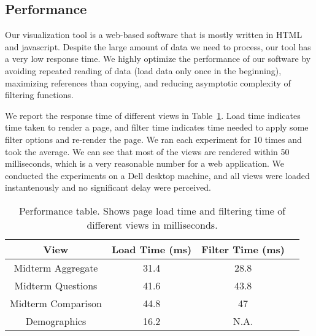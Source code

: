 \subsection{Performance}
Our visualization tool is a web-based software that is mostly written in HTML and javascript. Despite the large amount of data we need to process, our tool has a very low response time. We highly optimize the performance of our software by avoiding repeated reading of data (load data only once in the beginning), maximizing references than copying, and reducing asymptotic complexity of filtering functions.

We report the response time of different views in Table~\ref{tab:performance}. Load time indicates time taken to render a page, and filter time indicates time needed to apply some filter options and re-render the page. We ran each experiment for 10 times and took the average. We can see that most of the views are rendered within 50 milliseconds, which is a very reasonable number for a web application. We conducted the experiments on a Dell desktop machine, and all views were loaded instantenously and no significant delay were perceived.

\begin{table}
\begin{tabular}{ | c | c | c | c |}
  \hline
  View & Load Time (ms) & Filter Time (ms) \\ \hline
  Midterm Aggregate & 31.4 & 28.8 \\ \hline
  Midterm Questions & 41.6 & 43.8 \\ \hline
  Midterm Comparison & 44.8 & 47 \\ \hline
  Demographics & 16.2 & N.A. \\ \hline
\end{tabular}
\caption{Performance table. Shows page load time and filtering time of different views in milliseconds.}
\label{tab:performance}
\end{table}
